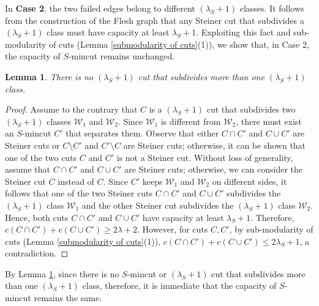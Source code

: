 \documentclass[letterpaper,11pt]{article}
\newtheorem{lemma}{Lemma}[]
\begin{document}
\noindent
In \textbf{Case 2}, the two failed edges belong to different $(\lambda_S+1)$ classes.
It follows from the construction of the Flesh graph that any Steiner cut that subdivides a $(\lambda_S+1)$ class must have capacity at least $\lambda_S+1$. Exploiting this fact and sub-modularity of cuts (Lemma \ref{submodularity of cuts}(1)), we show that, in Case 2, the capacity of $S$-mincut remains unchanged.
\begin{lemma} \label{lem : subdivides at most one class}
    There is no $(\lambda_S+1)$ cut that subdivides more than one $(\lambda_S+1)$ class.
\end{lemma}
\begin{proof}
    Assume to the contrary that $C$ is a $(\lambda_S+1)$ cut that subdivides two $(\lambda_S+1)$ classes ${\mathcal W}_1$ and $\mathcal W_2$. Since ${\mathcal W}_1$ is different from ${\mathcal W}_2$, there must exist an $S$-mincut $C'$ that separates them. Observe that either $C\cap C'$ and $C\cup C'$ are Steiner cuts or $C\setminus C'$ and $C'\setminus C$ are Steiner cuts; otherwise, it can be shown that one of the two cuts $C$ and $C'$ is not a Steiner cut. Without loss of generality, assume that $C\cap C'$ and $C\cup C'$ are Steiner cuts; otherwise, we can consider the Steiner cut $\overline{C}$ instead of $C$. Since $C'$ keeps ${\mathcal W}_1$ and ${\mathcal W}_2$ on different sides, it follows that one of the two Steiner cuts $C\cap C'$ and $C\cup C'$ subdivides the $(\lambda_S+1)$ class ${\mathcal W}_1$ and the other Steiner cut subdivides the $(\lambda_S+1)$ class ${\mathcal W}_2$. Hence, both cuts $C\cap C'$ and $C\cup C'$ have capacity at least $\lambda_S+1$. Therefore, $c(C\cap C')+c(C\cup C')\ge 2\lambda+2$. However, for cuts $C,C'$, by sub-modularity of cuts (Lemma \ref{submodularity of cuts}(1)), $c(C\cap C')+c(C\cup C')\le 2\lambda_S+1$, a contradiction.  
\end{proof}


 By Lemma \ref{lem : subdivides at most one class}, since there is no $S$-mincut or $(\lambda_S+1)$ cut that subdivides more than one $(\lambda_S+1)$ class, therefore, it is immediate that the capacity of $S$-mincut remains the same. \\
\end{document}
